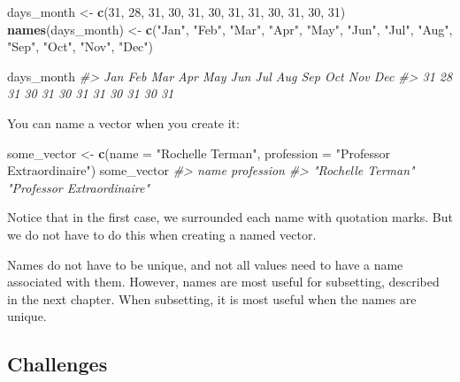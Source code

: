 \documentclass[]{book}
\newenvironment{Shaded}{\begin{snugshade}}{\end{snugshade}}
\newcommand{\KeywordTok}[1]{\textcolor[rgb]{0.13,0.29,0.53}{\textbf{#1}}}
\newcommand{\DataTypeTok}[1]{\textcolor[rgb]{0.13,0.29,0.53}{#1}}
\newcommand{\DecValTok}[1]{\textcolor[rgb]{0.00,0.00,0.81}{#1}}
\newcommand{\StringTok}[1]{\textcolor[rgb]{0.31,0.60,0.02}{#1}}
\newcommand{\CommentTok}[1]{\textcolor[rgb]{0.56,0.35,0.01}{\textit{#1}}}
\newcommand{\NormalTok}[1]{#1}
\begin{document}
\begin{Shaded}
\begin{Highlighting}[]
\NormalTok{days_month <-}\StringTok{ }\KeywordTok{c}\NormalTok{(}\DecValTok{31}\NormalTok{, }\DecValTok{28}\NormalTok{, }\DecValTok{31}\NormalTok{, }\DecValTok{30}\NormalTok{, }\DecValTok{31}\NormalTok{, }\DecValTok{30}\NormalTok{, }\DecValTok{31}\NormalTok{, }\DecValTok{31}\NormalTok{, }\DecValTok{30}\NormalTok{, }\DecValTok{31}\NormalTok{, }\DecValTok{30}\NormalTok{, }\DecValTok{31}\NormalTok{)}
\KeywordTok{names}\NormalTok{(days_month) <-}\StringTok{ }\KeywordTok{c}\NormalTok{(}\StringTok{"Jan"}\NormalTok{, }\StringTok{"Feb"}\NormalTok{, }\StringTok{"Mar"}\NormalTok{, }\StringTok{"Apr"}\NormalTok{, }\StringTok{"May"}\NormalTok{, }\StringTok{"Jun"}\NormalTok{, }\StringTok{"Jul"}\NormalTok{, }\StringTok{"Aug"}\NormalTok{, }\StringTok{"Sep"}\NormalTok{, }\StringTok{"Oct"}\NormalTok{, }\StringTok{"Nov"}\NormalTok{, }\StringTok{"Dec"}\NormalTok{)}

\NormalTok{days_month}
\CommentTok{#> Jan Feb Mar Apr May Jun Jul Aug Sep Oct Nov Dec }
\CommentTok{#>  31  28  31  30  31  30  31  31  30  31  30  31}
\end{Highlighting}
\end{Shaded}

You can name a vector when you create it:

\begin{Shaded}
\begin{Highlighting}[]
\NormalTok{some_vector <-}\StringTok{ }\KeywordTok{c}\NormalTok{(}\DataTypeTok{name =} \StringTok{"Rochelle Terman"}\NormalTok{, }\DataTypeTok{profession =} \StringTok{"Professor Extraordinaire"}\NormalTok{)}
\NormalTok{some_vector}
\CommentTok{#>                       name                 profession }
\CommentTok{#>          "Rochelle Terman" "Professor Extraordinaire"}
\end{Highlighting}
\end{Shaded}

Notice that in the first case, we surrounded each name with quotation
marks. But we do not have to do this when creating a named vector.

Names do not have to be unique, and not all values need to have a name
associated with them. However, names are most useful for subsetting,
described in the next chapter. When subsetting, it is most useful when
the names are unique.

\subsection{Challenges}\label{challenges-11}
\end{document}
